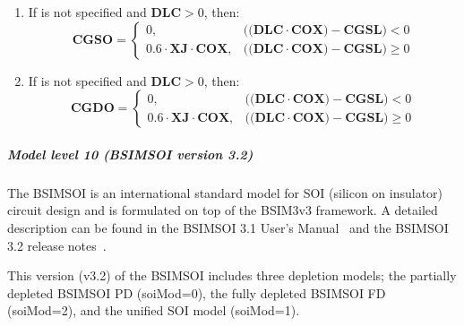 \begin{enumerate}
\item If  is not specified and $\mathbf{DLC} > 0$, then:
\[
\mathbf{CGSO} = \left\{ \begin{array}{ll}
0, & ((\mathbf{DLC \cdot COX) - CGSL)} < 0        \\
0.6 \cdot \mathbf{XJ \cdot COX}, & ((\mathbf{DLC \cdot COX) - CGSL)}
\geq 0
\end{array}
\right.
\]

\item If  is not specified and $\mathbf{DLC} > 0$, then:
\[
\mathbf{CGDO} = \left\{ \begin{array}{ll}
0, & ((\mathbf{DLC \cdot COX) - CGSL)} < 0 \\
0.6 \cdot \mathbf{XJ \cdot COX},
& ((\mathbf{DLC \cdot COX) - CGSL)} \geq 0
\end{array}
\right. \]
\end{enumerate}

\subparagraph{Model level 10 (BSIMSOI version 3.2)}

The BSIMSOI is an international standard model for SOI (silicon on insulator)
circuit design and is formulated on top of the BSIM3v3 framework.
A detailed description can be found in the BSIMSOI 3.1 User's
Manual~\cite{BSIMSOI:Manual} and the BSIMSOI 3.2 release
notes~\cite{BSIMSOI:3p2:Notes}.

This version (v3.2) of the BSIMSOI includes three depletion models;
the partially depleted BSIMSOI PD (soiMod=0), the fully depleted BSIMSOI
FD (soiMod=2), and the unified SOI model (soiMod=1).

